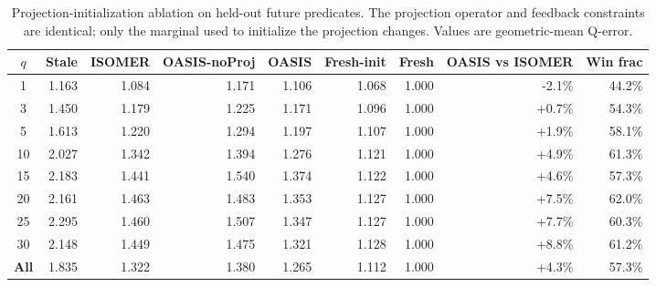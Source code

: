 \begin{table}[t]
  \centering
  \small
  \caption{Projection-initialization ablation on held-out future predicates. The projection operator and feedback constraints are identical; only the marginal used to initialize the projection changes. Values are geometric-mean Q-error.}
  \label{tab:projection_initialization}
  \setlength{\tabcolsep}{4pt}
  \begin{tabular}{c | rrrrrr | rr}
    \toprule
    $q$ & Stale & ISOMER & OASIS-noProj & OASIS & Fresh-init & Fresh & OASIS vs ISOMER & Win frac \\
    \midrule
    1 & 1.163 & 1.084 & 1.171 & 1.106 & 1.068 & 1.000 & -2.1\% & 44.2\% \\
    3 & 1.450 & 1.179 & 1.225 & 1.171 & 1.096 & 1.000 & +0.7\% & 54.3\% \\
    5 & 1.613 & 1.220 & 1.294 & 1.197 & 1.107 & 1.000 & +1.9\% & 58.1\% \\
    10 & 2.027 & 1.342 & 1.394 & 1.276 & 1.121 & 1.000 & +4.9\% & 61.3\% \\
    15 & 2.183 & 1.441 & 1.540 & 1.374 & 1.122 & 1.000 & +4.6\% & 57.3\% \\
    20 & 2.161 & 1.463 & 1.483 & 1.353 & 1.127 & 1.000 & +7.5\% & 62.0\% \\
    25 & 2.295 & 1.460 & 1.507 & 1.347 & 1.127 & 1.000 & +7.7\% & 60.3\% \\
    30 & 2.148 & 1.449 & 1.475 & 1.321 & 1.128 & 1.000 & +8.8\% & 61.2\% \\
    \midrule
    \textbf{All} & 1.835 & 1.322 & 1.380 & 1.265 & 1.112 & 1.000 & +4.3\% & 57.3\% \\
    \bottomrule
  \end{tabular}
\end{table}
